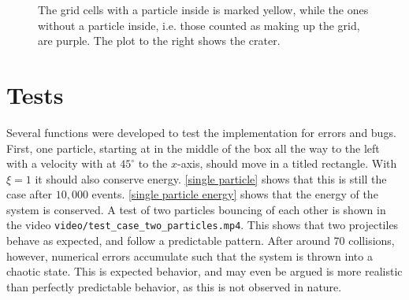 \documentclass{article}
\begin{document}
\begin{figure}[H]
\begin{subfigure}{.59\textwidth}
        \end{subfigure}
        \caption{The grid cells with a particle inside is marked yellow, while the ones without a particle inside, i.e.
        those counted as making up the grid, are purple.
        The plot to the right shows the crater.}
        \label{crater}
    \end{figure}


    \section*{Tests}
    Several functions were developed to test the implementation for errors and bugs.
    First, one particle, starting at in the middle of the box all the way to the left with a velocity with at $45^\circ$ to the $x$-axis, should move in a titled rectangle.
    With $\xi=1$ it should also conserve energy.
    \autoref{single particle} shows that this is still the case after $10,000$ events.
    \autoref{single particle energy} shows that the energy of the system is conserved.
    A test of two particles bouncing of each other is shown in the video \verb|video/test_case_two_particles.mp4|.
    This shows that two projectiles behave as expected, and follow a predictable pattern.
    After around 70 collisions, however, numerical errors accumulate such that the system is thrown into a chaotic state.
    This is expected behavior, and may even be argued is more realistic than perfectly predictable behavior, as this is not observed in nature.
\end{document}
